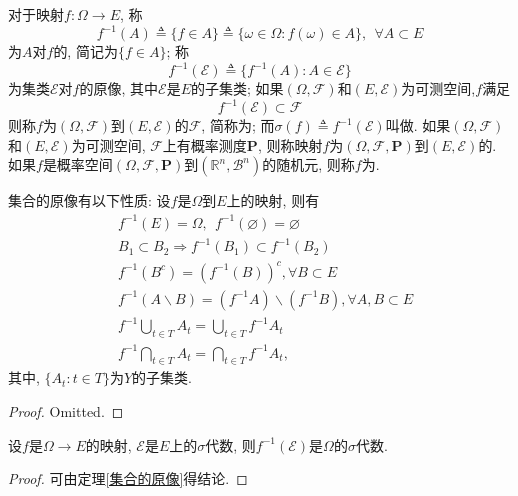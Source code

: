 \begin{definition}
	对于映射$f:\Omega\to E$, 称
	\begin{equation}
	f^{-1}(A)\triangleq \{f\in A\}\triangleq \{\omega\in\Omega:f(\omega)\in A\},~~\forall A\subset E
	\end{equation}
	为$A$对$f$的, 简记为$\{f\in A\}$; 称
	\begin{equation}
	f^{-1}(\mathscr{E})\triangleq \{ f^{-1}(A):A\in\mathscr{E} \}
	\end{equation}
	为集类$\mathscr{E}$对$f$的原像, 其中$\mathscr{E}$是$E$的子集类; 如果$(\Omega,\mathscr{F})$和$(E,\mathscr{E})$为可测空间,$f$满足
	\begin{equation}
	f^{-1}(\mathscr{E})\subset \mathscr{F}
	\end{equation}
	则称$f$为$(\Omega,\mathscr{F})$到$(E,\mathscr{E})$的$\mathscr{F}$, 简称为; 而$\sigma(f)\triangleq f^{-1}(\mathscr{E})$叫做. 如果$(\Omega,\mathscr{F})$和$(E,\mathscr{E})$为可测空间, $\mathscr{F}$上有概率测度$\mathbf{P}$, 则称映射$f$为$(\Omega,\mathscr{F},\mathbf{P})$到$(E,\mathscr{E})$的. 如果$f$是概率空间$(\Omega,\mathscr{F},\mathbf{P})$到$(\mathbb{R}^n,\mathscr{B}^n)$的随机元, 则称$f$为.
\end{definition}

\begin{theorem}\label{集合的原像}
	集合的原像有以下性质: 设$f$是$\Omega$到$E$上的映射, 则有
	\begin{align}
	&f^{-1}(E) = \Omega,~~f^{-1}(\varnothing) = \varnothing\nonumber\\
	&B_1\subset B_2\Rightarrow f^{-1}(B_1)\subset f^{-1}(B_2)\nonumber\\
	&f^{-1}(B^c) = \left(f^{-1}(B)\right)^c, \forall B\subset E\nonumber\\
	&f^{-1}(A\backslash B) = (f^{-1}A)\backslash (f^{-1}B), \forall A,B\subset E\nonumber\\
	&f^{-1}\bigcup_{t\in T}A_t = \bigcup_{t\in T}f^{-1}A_t\nonumber\\
	&f^{-1}\bigcap_{t\in T}A_t = \bigcap_{t\in T}f^{-1}A_t,
	\end{align}
	其中, $\{A_t:t\in T\}$为$Y$的子集类.
\end{theorem}
\begin{proof}
	Omitted.
\end{proof}

\begin{lemma}\label{lemma141}
	设$f$是$\Omega\to E$的映射, $\mathscr{E}$是$E$上的$\sigma$代数, 则$f^{-1}(\mathscr{E})$是$\Omega$的$\sigma$代数.	
\end{lemma}
\begin{proof}
	可由定理\ref{集合的原像}得结论.
\end{proof}

